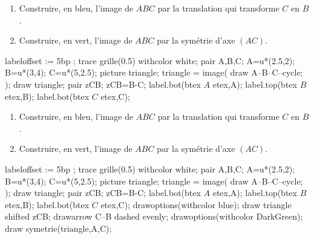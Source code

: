 \begin{exercice*}
    \begin{enumerate}
        \item Construire, en bleu, l'image de $ABC$ par la translation qui transforme $C$ en $B$.
        \item Construire, en vert, l'image de $ABC$ par la symétrie d'axe $(AC)$.
    \end{enumerate}    
    \begin{Geometrie}[CoinHD={(5.5u,6u)}]
        labeloffset := 5bp ;
        trace grille(0.5) withcolor white;
        pair A,B,C;
        A=u*(2.5,2);
        B=u*(3,4);
        C=u*(5,2.5);
        picture triangle;
        triangle = image( 
            draw A--B--C--cycle;
        );
        draw triangle;        
        pair zCB;
        zCB=B-C;
        label.bot(btex $A$ etex,A);                
        label.top(btex $B$ etex,B);
        label.bot(btex $C$ etex,C);
    \end{Geometrie}
\end{exercice*}
\begin{corrige}
    \begin{enumerate}
        \item Construire, en bleu, l'image de $ABC$ par la translation qui transforme $C$ en $B$.
        \item Construire, en vert, l'image de $ABC$ par la symétrie d'axe $(AC)$.
    \end{enumerate}
    \medskip
    \begin{Geometrie}[CoinHD={(5.5u,6u)}]
        labeloffset := 5bp ;
        trace grille(0.5) withcolor white;
        pair A,B,C;
        A=u*(2.5,2);
        B=u*(3,4);
        C=u*(5,2.5);
        picture triangle;
        triangle = image( 
            draw A--B--C--cycle;
        );
        draw triangle;        
        pair zCB;
        zCB=B-C;
        label.bot(btex $A$ etex,A);                
        label.top(btex $B$ etex,B);
        label.bot(btex $C$ etex,C);
        drawoptions(withcolor blue);
        draw triangle shifted zCB;
        drawarrow C--B dashed evenly;
        drawoptions(withcolor DarkGreen);
        draw symetrie(triangle,A,C);
    \end{Geometrie}
\end{corrige}

